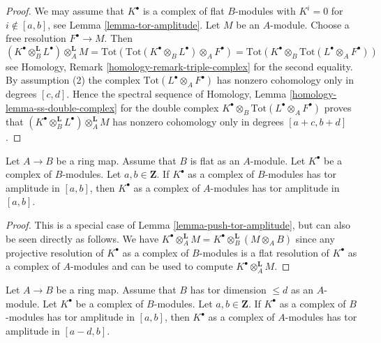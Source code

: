 \begin{proof}
We may assume that $K^\bullet$ is a complex of flat $B$-modules with $K^i = 0$
for $i \not \in [a, b]$, see Lemma \ref{lemma-tor-amplitude}.
Let $M$ be an $A$-module. Choose a free resolution $F^\bullet \to M$.
Then
$$
(K^\bullet \otimes_B^\mathbf{L} L^\bullet) \otimes_A^{\mathbf{L}} M =
\text{Tot}(\text{Tot}(K^\bullet \otimes_B L^\bullet) \otimes_A F^\bullet) =
\text{Tot}(K^\bullet \otimes_B \text{Tot}(L^\bullet \otimes_A F^\bullet))
$$
see Homology, Remark \ref{homology-remark-triple-complex} for the second
equality. By assumption (2) the complex
$\text{Tot}(L^\bullet \otimes_A F^\bullet)$
has nonzero cohomology only in degrees $[c, d]$. Hence the spectral sequence of
Homology, Lemma \ref{homology-lemma-ss-double-complex}
for the double complex
$K^\bullet \otimes_B \text{Tot}(L^\bullet \otimes_A F^\bullet)$
proves that
$(K^\bullet \otimes_B^\mathbf{L} L^\bullet) \otimes_A^{\mathbf{L}} M$
has nonzero cohomology only in degrees $[a + c, b + d]$.
\end{proof}

\begin{lemma}
\label{lemma-flat-push-tor-amplitude}
Let $A \to B$ be a ring map. Assume that $B$ is flat as an
$A$-module. Let $K^\bullet$ be a complex of $B$-modules.
Let $a, b \in \mathbf{Z}$. If $K^\bullet$ as a complex of $B$-modules
has tor amplitude in $[a, b]$, then $K^\bullet$ as a complex of
$A$-modules has tor amplitude in $[a, b]$.
\end{lemma}

\begin{proof}
This is a special case of Lemma \ref{lemma-push-tor-amplitude}, but can also
be seen directly as follows. We have
$K^\bullet \otimes_A^{\mathbf{L}} M =
K^\bullet \otimes_B^{\mathbf{L}} (M \otimes_A B)$
since any projective resolution of $K^\bullet$ as a complex of $B$-modules
is a flat resolution of $K^\bullet$ as a complex of $A$-modules and
can be used to compute $K^\bullet \otimes_A^{\mathbf{L}} M$.
\end{proof}

\begin{lemma}
\label{lemma-finite-tor-dimension-push-tor-amplitude}
Let $A \to B$ be a ring map. Assume that $B$ has tor dimension $\leq d$
as an $A$-module. Let $K^\bullet$ be a complex of $B$-modules.
Let $a, b \in \mathbf{Z}$. If $K^\bullet$ as a complex of $B$-modules
has tor amplitude in $[a, b]$, then $K^\bullet$ as a complex of
$A$-modules has tor amplitude in $[a - d, b]$.
\end{lemma}

